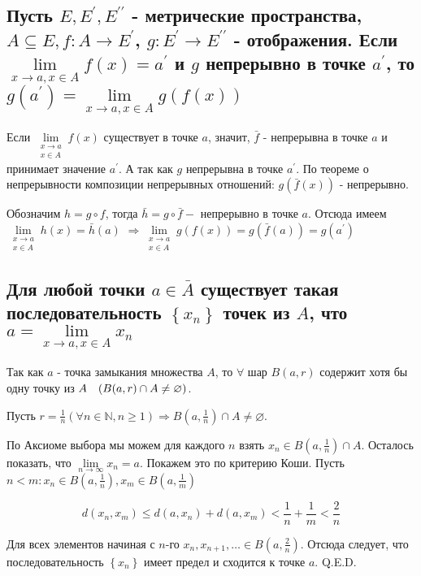\documentclass[a4paper]{article}
\begin{document}
\subsection{Пусть $E, E^{\prime}, E^{\prime \prime}$ - метрические пространства, $A \subseteq E, f: A \rightarrow E^{\prime}$, $g: E^{\prime} \rightarrow E^{\prime \prime}$ - отображения. Если $\lim\limits_{x \rightarrow a, x \in A} f(x)=a^{\prime}$ и $g$ непрерывно в точке $a^{\prime}$, то $g\left(a^{\prime}\right)=\lim\limits_{x \rightarrow a, x \in A} g(f(x))$}
Если $\lim\limits_{\substack{x \rightarrow a \\ x \in A}} f(x)$ существует в точке $a$, значит, $\bar{f}$ - непрерывна в точке $a$ и принимает значение $a^{\prime}$. А так как $g$ непрерывна в точке $a^{\prime}$. По теореме о непрерывности композиции непрерывных отношений: $g(\bar{f}(x))$ - непрерывно.

Обозначим $h=g \circ f$, тогда $\bar{h}=g \circ \bar{f}-$ непрерывно в точке $a$. Отсюда имеем $\lim\limits_{\substack{x \rightarrow a \\ x \in A}} h(x)=\bar{h}(a)$ $\Longrightarrow \lim\limits_{\substack{x \rightarrow a \\ x \in A}} g(f(x))=g(\bar{f}(a))=g\left(a^{\prime}\right)$

\subsection{Для любой точки $a \in \bar{A}$ существует такая последовательность $\left\{x_{n}\right\}$ точек из $A$, что $a=\lim\limits_{x \rightarrow a, x \in A} x_{n}$}


Так как $a$ - точка замыкания множества $A$, то $\forall$ шар $B(a, r)$ содержит хотя бы одну точку из $A\\[2mm]
\quad(B(a, r) \cap A \neq \varnothing)$.

Пусть $r=\frac{1}{n}(\forall n \in \mathbb{N}, n \geqslant 1) \Longrightarrow B\left(a, \frac{1}{n}\right) \cap A \neq \varnothing$.

По Аксиоме выбора мы можем для каждого $n$ взять $x_{n} \in B\left(a, \frac{1}{n}\right) \cap A$. Осталось показать, что $\lim\limits_{n \rightarrow \infty} x_{n}=a$. Покажем это по критерию Коши. Пусть $n<m: x_{n} \in B\left(a, \frac{1}{n}\right), x_{m} \in B\left(a, \frac{1}{m}\right)$

$$
d\left(x_{n}, x_{m}\right) \leqslant d\left(a, x_{n}\right)+d\left(a, x_{m}\right)<\frac{1}{n}+\frac{1}{m}<\frac{2}{n}
$$

Для всех элементов начиная с $n$-го $x_{n}, x_{n+1}, \ldots \in B\left(a, \frac{2}{n}\right)$. Отсюда следует, что последовательность $\left\{x_{n}\right\}$ имеет предел и сходится к точке $a$. Q.E.D.
\end{document}
